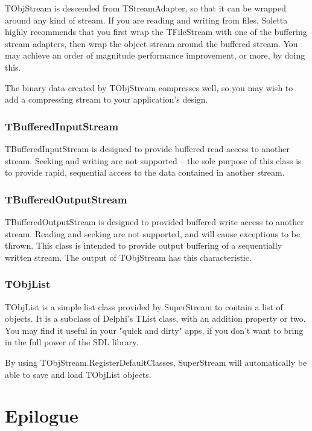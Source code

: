 \documentclass{report}
\begin{document}
TObjStream is descended from TStreamAdapter, so that it can be wrapped
around any kind of stream. If you are reading and writing from files,
Soletta highly recommends that you first wrap the TFileStream with one of
the buffering stream adapters, then wrap the object stream around the
buffered stream. You may achieve an order of magnitude performance
improvement, or more, by doing this.

The binary data created by TObjStream compresses well, so you may wish to
add a compressing stream to your application's design.

\subsection{TBufferedInputStream}

TBufferedInputStream is designed to provide buffered read access to another
stream. Seeking and writing are not supported -- the sole purpose of this
class is to provide rapid, sequential access to the data contained in
another stream.

\subsection{TBufferedOutputStream}

TBufferedOutputStream is designed to provided buffered write access to
another stream. Reading and seeking are not supported, and will cause
exceptions to be thrown. This class is intended to provide output buffering
of a sequentially written stream. The output of TObjStream has this
characteristic.

\subsection{TObjList}

TObjList is a simple list class provided by SuperStream to contain a list of
objects. It is a subclass of Delphi's TList class, with an addition property
or two. You may find it useful in your "quick and dirty" apps, if you don't
want to bring in the full power of the SDL library.

By using TObjStream.RegisterDefaultClasses, SuperStream will 
automatically be able to save and load TObjList objects.

\chapter{Epilogue}
\end{document}
